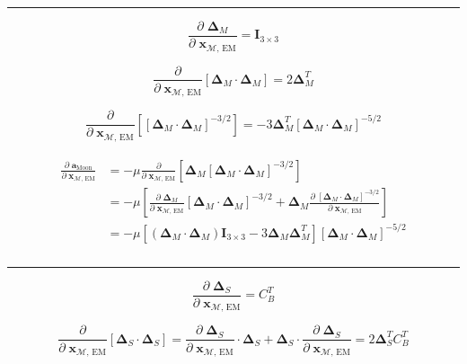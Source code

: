 \documentclass[]{article}
\newcommand{\pd}[2]{\frac{\partial\;#1}{\partial\;#2}}
\newcommand{\pddown}[2]{\frac{\partial}{\partial\;#2} \left[ #1 \right] }
\begin{document}
	\hrule \vspace{1em}
	
	\begin{equation*}
		\pd{\boldsymbol{\Delta}_M}{\mathbf{x}_{\mathcal{M}\text{, EM}}} = \mathbf{I}_{3\times 3}
	\end{equation*}
	
	\begin{equation*}
		\pddown{\boldsymbol{\Delta}_M \cdot \boldsymbol{\Delta}_M}{\mathbf{x}_{\mathcal{M}\text{, EM}}} = 2 \boldsymbol{\Delta}_M^T
	\end{equation*}
	
	\begin{equation*}
		\pddown{ [\boldsymbol{\Delta}_M \cdot \boldsymbol{\Delta}_M ]^{-3/2} }{\mathbf{x}_{\mathcal{M}\text{, EM}}} = -3 \boldsymbol{\Delta}_M^T [\boldsymbol{\Delta}_M \cdot \boldsymbol{\Delta}_M ]^{-5/2}
	\end{equation*}
	
	\begin{align}
	\begin{split}
		\pd{\mathbf{a}_\text{Moon}}{ \mathbf{x}_{\mathcal{M}\text{, EM}} } 
		&= -\mu \pddown{ \boldsymbol{\Delta}_M [\boldsymbol{\Delta}_M\cdot\boldsymbol{\Delta}_M]^{-3/2} }{ \mathbf{x}_{\mathcal{M}\text{, EM}} } \\
		&= -\mu \left[ \pd{ \boldsymbol{\Delta}_M}{ \mathbf{x}_{\mathcal{M}\text{, EM}} }[\boldsymbol{\Delta}_M\cdot\boldsymbol{\Delta}_M]^{-3/2} + \boldsymbol{\Delta}_M \pd{ [\boldsymbol{\Delta}_M\cdot\boldsymbol{\Delta}_M]^{-3/2} }{ \mathbf{x}_{\mathcal{M}\text{, EM}} } \right] \\
		&= -\mu \left[ (\boldsymbol{\Delta}_M\cdot\boldsymbol{\Delta}_M) \mathbf{I}_{3\times 3} - 3 \boldsymbol{\Delta}_M \boldsymbol{\Delta}_M^T \right] [\boldsymbol{\Delta}_M \cdot \boldsymbol{\Delta}_M ]^{-5/2} \\
	\end{split}
	\end{align}
	
	\hrule \vspace{1em}
	
	\begin{equation*}
		\pd{\boldsymbol{\Delta}_S}{\mathbf{x}_{\mathcal{M}\text{, EM}}} = C_B^T
	\end{equation*}
	
	\begin{equation*}
		\pddown{\boldsymbol{\Delta}_S \cdot \boldsymbol{\Delta}_S}{\mathbf{x}_{\mathcal{M}\text{, EM}}} = \pd{\boldsymbol{\Delta}_S}{\mathbf{x}_{\mathcal{M}\text{, EM}}} \cdot \boldsymbol{\Delta}_S + \boldsymbol{\Delta}_S \cdot \pd{\boldsymbol{\Delta}_S}{\mathbf{x}_{\mathcal{M}\text{, EM}}} = 2 \boldsymbol{\Delta}_S^T C_B^T
	\end{equation*}
	
\end{document}
